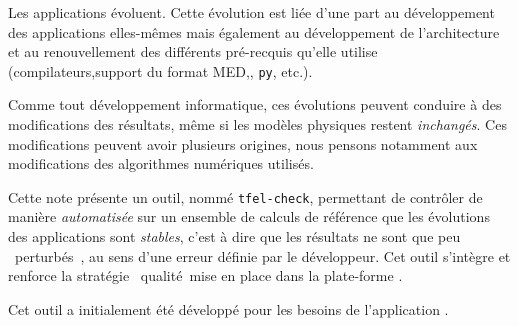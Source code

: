 
Les applications \tfel{} évoluent. Cette évolution est liée d'une part
au développement des applications elles-mêmes mais également au développement
de l'architecture \tfel{} et au renouvellement des différents pré-recquis
qu'elle utilise (compilateurs,support du format MED,\castem{},
{\tt py\castem{}}, etc.).

Comme tout développement informatique, ces évolutions peuvent conduire à des
modifications des résultats, même si les modèles physiques restent
{\em inchangés}. Ces modifications peuvent avoir plusieurs origines, nous pensons
notamment aux modifications des algorithmes numériques utilisés.

Cette note présente un outil, nommé {\tt tfel-check}, permettant
de contrôler de manière {\em automatisée} sur un ensemble de calculs de référence
que les évolutions des applications sont {\em stables}, c'est à dire
que les résultats ne sont que peu \og~perturbés~\fg, au sens d'une erreur
définie par le développeur. Cet outil s'intègre et renforce
la stratégie \og~qualité~\fg mise en place dans la plate-forme \tfel{}.

Cet outil a initialement été développé pour les besoins de l'application
\celaeno{}.


